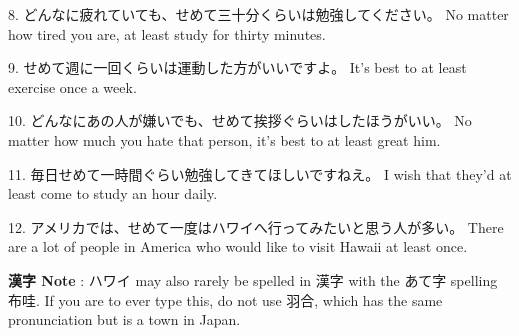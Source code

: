 \par{8. どんなに疲れていても、せめて三十分くらいは勉強してください。 \hfill\break
No matter how tired you are, at least study for thirty minutes. }

\par{9. せめて週に一回くらいは運動した方がいいですよ。 \hfill\break
It's best to at least exercise once a week. }

\par{10. どんなにあの人が嫌いでも、せめて挨拶ぐらいはしたほうがいい。 \hfill\break
No matter how much you hate that person, it's best to at least great him. }

\par{11. 毎日せめて一時間ぐらい勉強してきてほしいですねえ。 \hfill\break
I wish that they'd at least come to study an hour daily. }

\par{12. アメリカでは、せめて一度はハワイへ行ってみたいと思う人が多い。 \hfill\break
There are a lot of people in America who would like to visit Hawaii at least once. }

\par{\textbf{漢字 Note }: ハワイ may also rarely be spelled in 漢字 with the あて字 spelling 布哇. If you are to ever type this, do not use 羽合, which has the same pronunciation but is a town in Japan. }
    